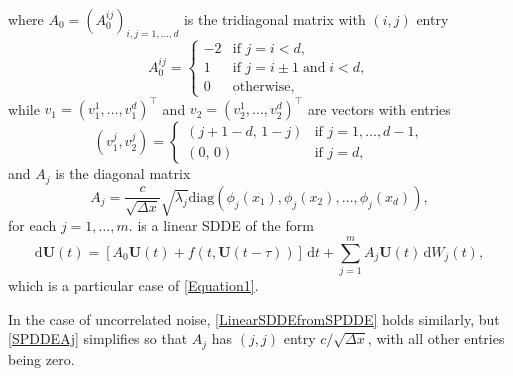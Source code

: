 \documentclass[onefignum]{siamart250211}
\begin{document}
\begin{example}
\begin{align}
\end{align}
where $A_0=(A_0^{ij})_{i,j=1,\ldots,d}$ is the tridiagonal matrix with $(i,j)$ entry
\begin{equation}A_0^{ij}=\begin{cases}-2&\textrm{if }j=i<d,\\ 1&\textrm{if }j=i\pm1\;\textrm{and}\;i<d,\\ 0&\textrm{otherwise},\end{cases}\label{SPDDEA0}\end{equation}
while $v_1=(v_1^1,\ldots,v_1^d)^\intercal$ and $v_2=(v_2^1,\ldots,v_2^d)^\intercal$ are vectors with entries
\[\left(v_1^j,v_2^j\right)=\begin{cases}\left(j+1-d,\,1-j\right)&\textrm{if }j=1,\ldots,d-1,\\ (0,\,0)&\textrm{if }j=d,\end{cases}\]
and $A_j$ is the diagonal matrix
\begin{equation}A_j=\frac{c}{\sqrt{\Delta x}}\sqrt{\lambda_j}\mathrm{diag}\left(\phi_j(x_1),\phi_j(x_2),\ldots,\phi_j(x_d)\right),\label{SPDDEAj}\end{equation}
for each $j=1,\ldots,m$.  is a linear SDDE of the form
\begin{equation}\mathrm{d}\bm{U}(t)=[A_0\bm{U}(t)+f(t,\bm{U}(t-\tau))]\,\mathrm{d}t+\sum_{j=1}^mA_j\bm{U}(t)\,\mathrm{d}W_j(t),\label{LinearSDDEfromSPDDE}\end{equation}
which is a particular case of \cref{Equation1}.

\begin{remark}
In the case of uncorrelated noise, \cref{LinearSDDEfromSPDDE} holds similarly, but \cref{SPDDEAj} simplifies so that $A_j$ has $(j,j)$ entry $c/\sqrt{\Delta x}$, with all other entries being zero.
\end{remark}


\end{example}
\end{document}

